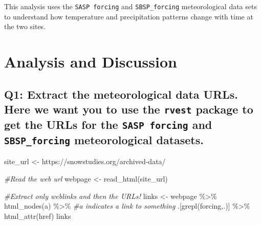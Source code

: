 \documentclass[
]{book}
\newenvironment{Shaded}{\begin{snugshade}}{\end{snugshade}}
\newcommand{\CommentTok}[1]{\textcolor[rgb]{0.56,0.35,0.01}{\textit{#1}}}
\newcommand{\FunctionTok}[1]{\textcolor[rgb]{0.00,0.00,0.00}{#1}}
\newcommand{\NormalTok}[1]{#1}
\newcommand{\OtherTok}[1]{\textcolor[rgb]{0.56,0.35,0.01}{#1}}
\newcommand{\SpecialCharTok}[1]{\textcolor[rgb]{0.00,0.00,0.00}{#1}}
\newcommand{\StringTok}[1]{\textcolor[rgb]{0.31,0.60,0.02}{#1}}
\begin{document}
This analysis uses the \texttt{SASP\ forcing} and \texttt{SBSP\_forcing} meteorological data sets to understand how temperature and precipitation patterns change with time at the two sites.

\hypertarget{analysis-and-discussion}{%
\section{Analysis and Discussion}\label{analysis-and-discussion}}

\hypertarget{q1-extract-the-meteorological-data-urls.-here-we-want-you-to-use-the-rvest-package-to-get-the-urls-for-the-sasp-forcing-and-sbsp_forcing-meteorological-datasets.}{%
\subsection{\texorpdfstring{Q1: Extract the meteorological data URLs. Here we want you to use the \texttt{rvest} package to get the URLs for the \texttt{SASP\ forcing} and \texttt{SBSP\_forcing} meteorological datasets.}{Q1: Extract the meteorological data URLs. Here we want you to use the rvest package to get the URLs for the SASP forcing and SBSP\_forcing meteorological datasets.}}\label{q1-extract-the-meteorological-data-urls.-here-we-want-you-to-use-the-rvest-package-to-get-the-urls-for-the-sasp-forcing-and-sbsp_forcing-meteorological-datasets.}}

\begin{Shaded}
\begin{Highlighting}[]
\NormalTok{site\_url }\OtherTok{\textless{}{-}} \StringTok{\textquotesingle{}https://snowstudies.org/archived{-}data/\textquotesingle{}}

\CommentTok{\#Read the web url}
\NormalTok{webpage }\OtherTok{\textless{}{-}} \FunctionTok{read\_html}\NormalTok{(site\_url)}

\CommentTok{\#Extract only weblinks and then the URLs!}
\NormalTok{links }\OtherTok{\textless{}{-}}\NormalTok{ webpage }\SpecialCharTok{\%\textgreater{}\%}
  \FunctionTok{html\_nodes}\NormalTok{(}\StringTok{\textquotesingle{}a\textquotesingle{}}\NormalTok{) }\SpecialCharTok{\%\textgreater{}\%} \CommentTok{\#a indicates a link to something }
\NormalTok{  .[}\FunctionTok{grepl}\NormalTok{(}\StringTok{\textquotesingle{}forcing\textquotesingle{}}\NormalTok{,.)] }\SpecialCharTok{\%\textgreater{}\%}
  \FunctionTok{html\_attr}\NormalTok{(}\StringTok{\textquotesingle{}href\textquotesingle{}}\NormalTok{)}
\NormalTok{links}
\end{Highlighting}
\end{Shaded}
\end{document}
